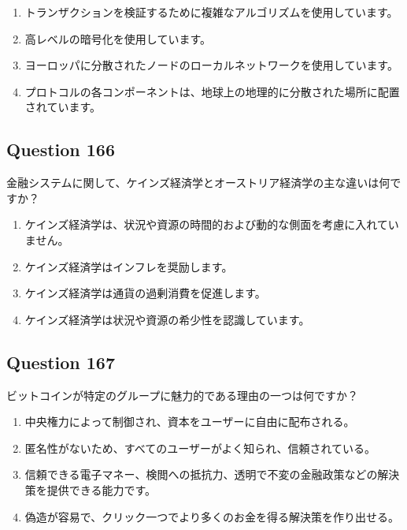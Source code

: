 \documentclass[12pt,a4paper]{article}
\begin{document}
\begin{enumerate}[label=\Alph*., leftmargin=*]
\item トランザクションを検証するために複雑なアルゴリズムを使用しています。
\item 高レベルの暗号化を使用しています。
\item ヨーロッパに分散されたノードのローカルネットワークを使用しています。
\item プロトコルの各コンポーネントは、地球上の地理的に分散された場所に配置されています。
\end{enumerate}

\bigskip


\subsection*{Question 166}
金融システムに関して、ケインズ経済学とオーストリア経済学の主な違いは何ですか？

\begin{enumerate}[label=\Alph*., leftmargin=*]
\item ケインズ経済学は、状況や資源の時間的および動的な側面を考慮に入れていません。
\item ケインズ経済学はインフレを奨励します。
\item ケインズ経済学は通貨の過剰消費を促進します。
\item ケインズ経済学は状況や資源の希少性を認識しています。
\end{enumerate}

\bigskip


\subsection*{Question 167}
ビットコインが特定のグループに魅力的である理由の一つは何ですか？

\begin{enumerate}[label=\Alph*., leftmargin=*]
\item 中央権力によって制御され、資本をユーザーに自由に配布される。
\item 匿名性がないため、すべてのユーザーがよく知られ、信頼されている。
\item 信頼できる電子マネー、検閲への抵抗力、透明で不変の金融政策などの解決策を提供できる能力です。
\item 偽造が容易で、クリック一つでより多くのお金を得る解決策を作り出せる。
\end{enumerate}

\bigskip
\end{document}
